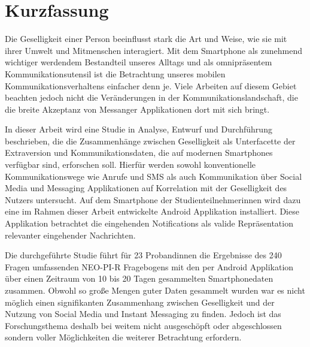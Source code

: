 
\chapter*{Kurzfassung}
\label{ch:GermanAbstract}

Die Geselligkeit einer Person beeinflusst stark die Art und Weise, wie sie mit ihrer Umwelt und Mitmenschen interagiert. 
Mit dem Smartphone als zunehmend wichtiger werdendem Bestandteil unseres Alltags und als omnipräsentem Kommunikationsutensil ist 
die Betrachtung unseres mobilen Kommunikationsverhaltens einfacher denn je. 
Viele Arbeiten auf diesem Gebiet beachten jedoch nicht die Veränderungen in der Kommunikationslandschaft, die die breite Akzeptanz von Messanger Applikationen dort mit sich bringt.
\par
In dieser Arbeit wird eine Studie in Analyse, Entwurf und Durchführung beschrieben, die die Zusammenhänge zwischen Geselligkeit als Unterfacette der Extraversion und Kommunikationsdaten, die auf modernen Smartphones verfügbar sind, erforschen soll. 
Hierfür werden sowohl konventionelle Kommunikationswege wie Anrufe und SMS als auch Kommunikation über Social Media und Messaging Applikationen auf Korrelation mit der Geselligkeit des Nutzers untersucht.
Auf dem Smartphone der Studienteilnehmerinnen wird dazu eine im Rahmen dieser Arbeit entwickelte Android Applikation installiert.
Diese Applikation betrachtet die eingehenden Notifications als valide Repräsentation relevanter eingehender Nachrichten.
\par
Die durchgeführte Studie führt für 23 Probandinnen die Ergebnisse des 240 Fragen umfassenden NEO-PI-R Fragebogens mit den per Android Applikation über einen Zeitraum von 10 bis 20 Tagen gesammelten Smartphonedaten zusammen.
Obwohl so große Mengen guter Daten gesammelt wurden war es nicht möglich einen signifikanten Zusammenhang zwischen Geselligkeit und der Nutzung von Social Media und Instant Messaging zu finden.
Jedoch ist das Forschungsthema deshalb bei weitem nicht ausgeschöpft oder abgeschlossen sondern voller Möglichkeiten die weiterer Betrachtung erfordern.
\par 


